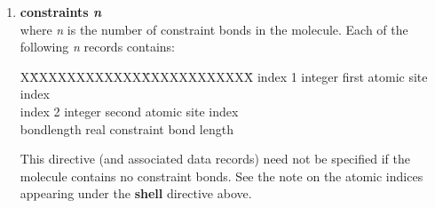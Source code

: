 \begin{enumerate}
{\bf Note} that the atomic site indices referred to above are
indices arising from numbering each atom in the molecule from 1 to
the number specified in the {\bf atoms} directive for this
molecule.  This same numbering scheme should be used for all
descriptions of this molecule, including the {\bf constraints},
{\bf pmf}, {\bf rigid}, {\bf teth}, {\bf bonds}, {\bf angles},
{\bf dihedrals} and {\bf inversions} entries described below.
\D will itself construct the global indices for all atoms in the systems.

{\bf Note} that \D determines which shell model to use by scanning
shell weights provided the FIELD file (see Section \ref{shell-model}).
If all shells have zero weight the \D will choose the relaxed shell
model.  If no shell has zero weight then \D will choose the dynamical
one.  In case when some shells are massless and some are not \D will
terminate execution controllably and provide information about the
error and possible possible choices of action in the OUTPUT file
(see Section \ref{output-file}).

This directive (and associated data records) need not be specified if
the molecule contains no core-shell units.

\item {\bf constraints {\em n}} \\
where {\em n} is the number of constraint bonds in the molecule.
Each of the following {\em n} records contains:
\begin{tabbing}
X\=XXXXXXXXXXXX\=XXXXXXXXXXXX\=\kill
\> index 1    \> integer \> first atomic site index \\
\> index 2    \> integer \> second atomic site index \\
\> bondlength \> real    \> constraint bond length
\end{tabbing}
This directive (and associated data records) need not be specified
if the molecule contains no constraint
bonds.  See the note on the atomic indices
appearing under the {\bf shell} directive above.


\end{enumerate}
